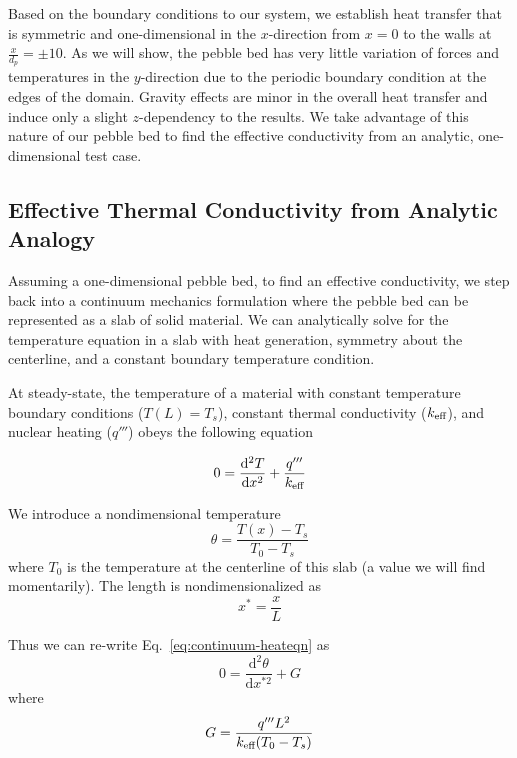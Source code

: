 Based on the boundary conditions to our system, we establish heat transfer that is symmetric and one-dimensional in the $x$-direction from $x=0$ to the walls at $\frac{x}{d_p} = \pm 10$. As we will show, the pebble bed has very little variation of forces and temperatures in the $y$-direction due to the periodic boundary condition at the edges of the domain. Gravity effects are minor in the overall heat transfer and induce only a slight $z$-dependency to the results. We take advantage of this nature of our pebble bed to find the effective conductivity from an analytic, one-dimensional test case.





\subsection{Effective Thermal Conductivity from Analytic Analogy}
Assuming a one-dimensional pebble bed, to find an effective conductivity, we step back into a continuum mechanics formulation where the pebble bed can be represented as a slab of solid material. We can analytically solve for the temperature equation in a slab with heat generation, symmetry about the centerline, and a constant boundary temperature condition.

At steady-state, the temperature of a material with constant temperature boundary conditions ($T(L) = T_s$), constant thermal conductivity ($k_\text{eff}$), and nuclear heating ($q'''$) obeys the following equation

\begin{equation}\label{eq:continuum-heateqn}
	0 = \frac{\mathrm{d}^2T}{\mathrm{d}x^2} + \frac{q'''}{k_\text{eff}}
\end{equation}

We introduce a nondimensional temperature
\begin{equation}
	\theta = \frac{T(x) - T_s}{T_0 - T_s}
\end{equation}
where $T_0$ is the temperature at the centerline of this slab (a value we will find momentarily). The length is nondimensionalized as
\begin{equation}
	x^* = \frac{x}{L}
\end{equation}

Thus we can re-write Eq.~\ref{eq:continuum-heateqn} as
\begin{equation}\label{eq:continuum-heateqn-nondim}
	0 = \frac{\mathrm{d}^2\theta}{\mathrm{d}x^{*2}} + G
\end{equation}
where
\begin{equation}
	G = \frac{q'''L^2}{k_\text{eff}(T_0 - T_s)}
\end{equation}

